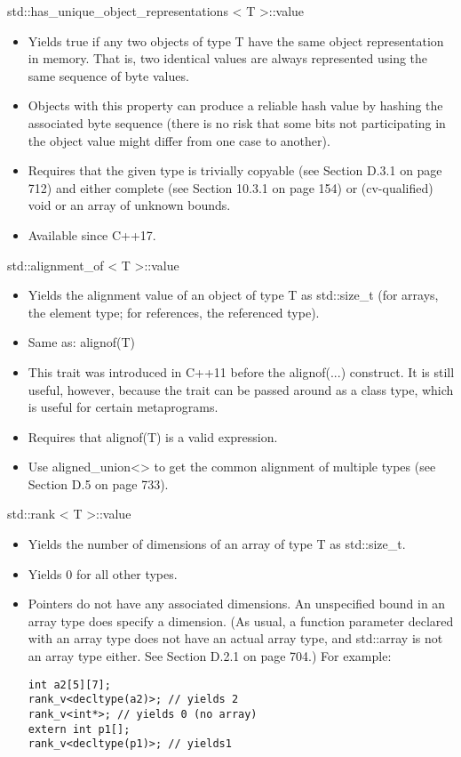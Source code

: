std::has\_unique\_object\_representations < T >::value

\begin{itemize}
\item 
Yields true if any two objects of type T have the same object representation in memory. That is, two identical values are always represented using the same sequence of byte values.

\item 
Objects with this property can produce a reliable hash value by hashing the associated byte sequence (there is no risk that some bits not participating in the object value might differ from one case to another).

\item 
Requires that the given type is trivially copyable (see Section D.3.1 on page 712) and either complete (see Section 10.3.1 on page 154) or (cv-qualified) void or an array of unknown bounds.

\item 
Available since C++17.
\end{itemize}

std::alignment\_of < T >::value

\begin{itemize}
\item 
Yields the alignment value of an object of type T as std::size\_t (for arrays, the element type; for references, the referenced type).

\item 
Same as: alignof(T)

\item 
This trait was introduced in C++11 before the alignof(...) construct. It is still useful, however, because the trait can be passed around as a class type, which is useful for certain metaprograms.

\item 
Requires that alignof(T) is a valid expression.

\item 
Use aligned\_union<> to get the common alignment of multiple types (see Section D.5 on page 733).
\end{itemize}

std::rank < T >::value

\begin{itemize}
\item 
Yields the number of dimensions of an array of type T as std::size\_t.

\item 
Yields 0 for all other types.

\item 
Pointers do not have any associated dimensions. An unspecified bound in an array type does specify a dimension. (As usual, a function parameter declared with an array type does not have an actual array type, and std::array is not an array type either. See Section D.2.1 on page 704.)
For example:
\begin{lstlisting}[style=styleCXX]
int a2[5][7];
rank_v<decltype(a2)>; // yields 2
rank_v<int*>; // yields 0 (no array)
extern int p1[];
rank_v<decltype(p1)>; // yields1
\end{lstlisting}
\end{itemize}

